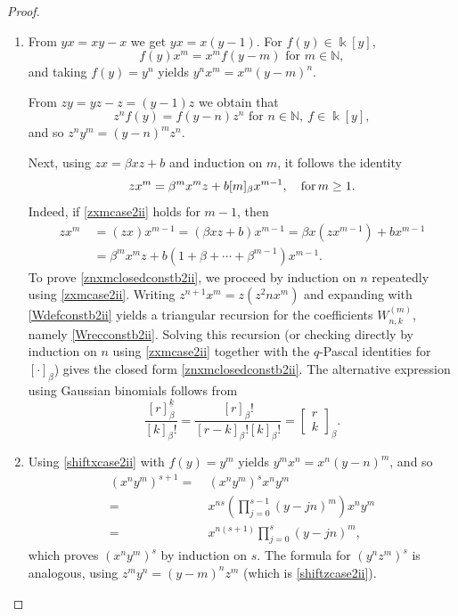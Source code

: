 \documentclass{amsart}
\theoremstyle{definition}
\theoremstyle{remark}
\numberwithin{equation}{section}
\begin{document}
\begin{proof}
\begin{enumerate}
    \item [\rm (1)]  From $yx = xy-x$ we get $yx = x(y-1)$. For $f(y)\in\Bbbk[y]$,
\begin{equation}\label{shiftxcase2ii}
f(y)  x^m=x^m f(y-m) \text{ for } m\in\mathbb{N},
\end{equation}        
and taking $f(y) = y^n$ yields $y^n x^m=x^m(y-m)^n$.

From $zy = yz - z = (y-1)z$ we obtain that
\begin{equation}\label{shiftzcase2ii}
z^n f(y)=f(y-n)  z^n\text{ for } n\in\mathbb{N},\ f\in\Bbbk[y],
\end{equation}
and so $z^n y^m = (y - n)^m z^n$.

Next, using $zx = \beta xz+b$ and induction on $m$, it follows the identity
\begin{equation}\label{zxmcase2ii}
z x^m=\beta^m x^m z+b  [m]_\beta  x^{m-1}, \quad {\rm for} \, m\ge 1.
\end{equation}
Indeed, if \eqref{zxmcase2ii} holds for $m-1$, then
\begin{align*}
z x^m &\ =(zx)x^{m-1}=(\beta xz+b)x^{m-1} =\beta x(zx^{m-1})+b x^{m-1} \\
&\ =\beta^m x^m z+b(1+\beta+\cdots+\beta^{m-1})x^{m-1}.
\end{align*}
To prove \eqref{znxmclosedconstb2ii}, we proceed by induction on $n$ repeatedly using \eqref{zxmcase2ii}. Writing $z^{n+1}x^m = z(z^2n x^m)$ and expanding with \eqref{Wdefconstb2ii} yields a triangular recursion for the coefficients $W^{(m)}_{n,k}$, namely \eqref{Wrecconstb2ii}. Solving this recursion (or checking directly
by induction on $n$ using \eqref{zxmcase2ii} together with the $q$-Pascal identities for $[  \cdot  ]_\beta$)
gives the closed form \eqref{znxmclosedconstb2ii}. The alternative expression using Gaussian binomials follows from
\[
\frac{[r]^{\underline{k}}_\beta}{[k]_\beta!}
=\frac{[r]_\beta!}{[r-k]_\beta!  [k]_\beta!}
=\begin{bmatrix} r\\ k\end{bmatrix}_\beta.
\]

\item [\rm (2)] Using \eqref{shiftxcase2ii} with $f(y) = y^m$ yields $y^m x^n = x^n (y-n)^m$, and so
\begin{align*}
  (x^n y^m)^{s+1} = &\ (x^n y^m)^s x^n y^m  \\   
  = &\ x^{ns}\left(\prod_{j=0}^{s-1}(y-jn)^m\right)x^n y^m \\
  = &\ x^{n(s+1)}\prod_{j=0}^{s}(y-jn)^m, 
\end{align*}
which proves $(x^n y^m)^s$ by induction on $s$. The formula for $(y^n z^m)^s$ is analogous, using $z^m y^n = (y - m)^n z^m$ (which is \eqref{shiftzcase2ii}).


\end{enumerate}
\end{proof}
\end{document}

